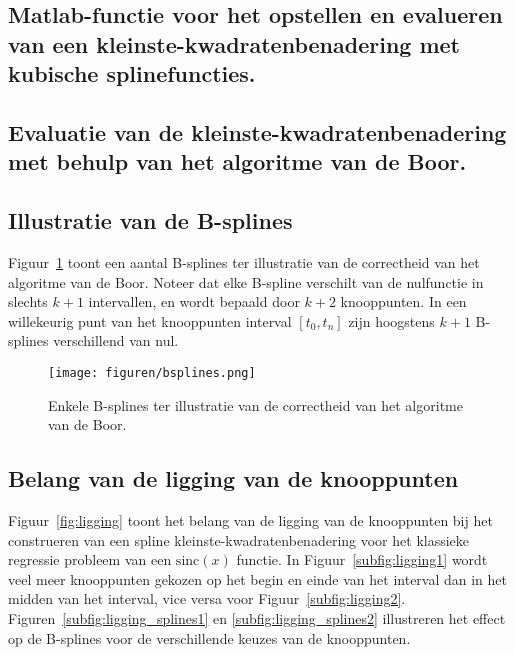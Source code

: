 \documentclass[10pt,a4paper]{article}
\begin{document}
\subsection{Matlab-functie voor het opstellen en evalueren van een kleinste-kwadratenbenadering met kubische splinefuncties.}




\subsection{Evaluatie van de kleinste-kwadratenbenadering met behulp van het algoritme van de Boor.}




\subsection{Illustratie van de B-splines}

Figuur~\ref{fig:bsplines} toont een aantal B-splines ter illustratie van de correctheid van het algoritme van de Boor. Noteer dat elke B-spline verschilt van de nulfunctie in slechts $k+1$ intervallen, en wordt bepaald door $k+2$ knooppunten. In een willekeurig punt van het knooppunten interval $[t_{0},t_{n}]$ zijn hoogstens $k+1$ B-splines verschillend van nul.

\begin{figure}[h]
	\centering
	\texttt{[image: figuren/bsplines.png]}
	\caption{Enkele B-splines ter illustratie van de correctheid van het algoritme van de Boor.}
	\label{fig:bsplines}
\end{figure}


\subsection{Belang van de ligging van de knooppunten}

Figuur~\ref{fig:ligging} toont het belang van de ligging van de knooppunten bij het construeren van een spline kleinste-kwadratenbenadering voor het klassieke regressie probleem van een $\textrm{sinc}(x)$ functie. In Figuur~\ref{subfig:ligging1} wordt veel meer knooppunten gekozen op het begin en einde van het interval dan in het midden van het interval, vice versa voor Figuur~\ref{subfig:ligging2}. Figuren~\ref{subfig:ligging_splines1} en \ref{subfig:ligging_splines2} illustreren het effect op de B-splines voor de verschillende keuzes van de knooppunten.
\end{document}
